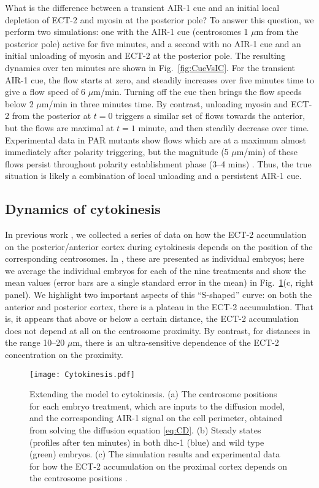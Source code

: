 \documentclass[11pt]{article}
\begin{document}
What is the difference between a transient AIR-1 cue and an initial local depletion of ECT-2 and myosin at the posterior pole? To answer this question, we perform two simulations: one with the AIR-1 cue (centrosomes 1 $\mu$m from the posterior pole) active for five minutes, and a second with no AIR-1 cue and an initial unloading of myosin and ECT-2 at the posterior pole. The resulting dynamics over ten minutes are shown in Fig.\ \ref{fig:CueVsIC}. For the transient AIR-1 cue, the flow starts at zero, and steadily increases over five minutes time to give a flow speed of 6 $\mu$m/min. Turning off the cue then brings the flow speeds below 2 $\mu$m/min in three minutes time. By contrast, unloading myosin and ECT-2 from the posterior at $t=0$ triggers a similar set of flows towards the anterior, but the flows are maximal at $t=1$ minute, and then steadily decrease over time. Experimental data in PAR mutants show flows which are at a maximum almost immediately after polarity triggering, but the magnitude (5 $\mu$m/min) of these flows persist throughout polarity establishment phase (3--4 mins) \citep[Fig.~2G]{gross2019guiding}. Thus, the true situation is likely a combination of local unloading and a persistent AIR-1 cue. 


\subsection{Dynamics of cytokinesis}
In previous work \citep{longhini2022aurora}, we collected a series of data on how the ECT-2 accumulation on the posterior/anterior cortex during cytokinesis depends on the position of the corresponding centrosomes. In \citep[Fig.~7A]{longhini2022aurora}, these are presented as individual embryos; here we average the individual embryos for each of the nine treatments and show the mean values (error bars are a single standard error in the mean) in Fig.\ \ref{fig:CytoSit}(c, right panel). We highlight two important aspects of this ``S-shaped'' curve: on both the anterior and posterior cortex, there is a plateau in the ECT-2 accumulation. That is, it appears that above or below a certain distance, the ECT-2 accumulation does not depend at all on the centrosome proximity. By contrast, for distances in the range 10--20 $\mu$m, there is an ultra-sensitive dependence of the ECT-2 concentration on the proximity. 

\begin{figure}
\centering
\texttt{[image: Cytokinesis.pdf]}
\caption{\label{fig:CytoSit} Extending the model to cytokinesis. (a) The centrosome positions for each embryo treatment, which are inputs to the diffusion model, and the corresponding AIR-1 signal on the cell perimeter, obtained from solving the diffusion equation \eqref{eq:CD}. (b) Steady states (profiles after ten minutes)  in both dhc-1 (blue) and wild type (green) embryos. (c) The simulation results and experimental data for how the ECT-2 accumulation on the proximal cortex depends on the centrosome positions \citep[Fig.~7A]{longhini2022aurora}. }
\end{figure}
\end{document}
